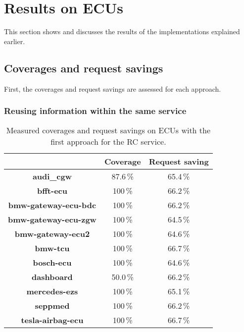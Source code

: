 \chapter{Results on ECUs}

This section shows and discusses the results of the implementations explained earlier.

\section{Coverages and request savings}

First, the coverages and request savings are assessed for each approach.

\subsection{Reusing information within the same service}

\begin{table}[H]
    \begin{center}
    \begin{tabular}{ccc}
        \hline
        & \textbf{Coverage} & \textbf{Request saving} \\
        \hline
        \textbf{audi\_cgw} & 87.6\,\% & 65.4\,\% \\
        \textbf{bfft-ecu} & 100\,\% & 66.2\,\% \\
        \textbf{bmw-gateway-ecu-bdc} & 100\,\% & 66.2\,\% \\
        \textbf{bmw-gateway-ecu-zgw} & 100\,\% & 64.5\,\% \\
        \textbf{bmw-gateway-ecu2} & 100\,\% & 64.6\,\% \\
        \textbf{bmw-tcu} & 100\,\% & 66.7\,\% \\
        \textbf{bosch-ecu} & 100\,\% & 64.6\,\% \\
        \textbf{dashboard} & 50.0\,\% & 66.2\,\% \\
        \textbf{mercedes-ezs} & 100\,\% & 65.1\,\% \\
        \textbf{seppmed} & 100\,\% & 66.2\,\% \\
        \textbf{tesla-airbag-ecu} & 100\,\% & 66.7\,\% \\
        \hline

    \end{tabular}
    \end{center}
    \caption{Measured coverages and request savings on ECUs with the first approach for the RC service.}
    \label{tab:evaluation-approach1}
\end{table}

